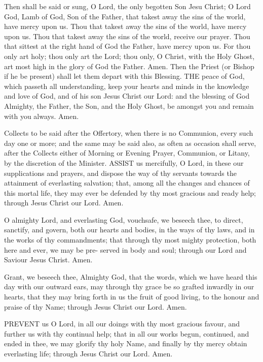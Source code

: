 Then shall be said or sung,
    O Lord, the only begotten Son Jesu Christ; O Lord God, Lamb of God, Son of the Father, that takest away the sins of the world, have mercy upon us. Thou that takest away the sins of the world, have mercy upon us. Thou that takest away the sins of the world, receive our prayer. Thou that sittest at the right hand of God the Father, have mercy upon us.
    For thou only art holy; thou only art the Lord; thou only, O Christ, with the Holy Ghost, art most high in the glory of God the Father. Amen.
Then the Priest (or Bishop if he be present) shall let them depart with this Blessing.
THE peace of God, which passeth all understanding, keep your hearts and minds in the knowledge and love of God, and of his son Jesus Christ our Lord: and the blessing of God Almighty, the Father, the Son, and the Holy Ghost, be amongst you and remain with you always. Amen.

Collects to be said after the Offertory, when there is no Communion, every such day one or more; and the same may be said also, as often as occasion shall serve, after the Collects either of Morning or Evening Prayer, Communion, or Litany, by the discretion of the Minister.
ASSIST us mercifully, O Lord, in these our supplications and prayers, and dispose the way of thy servants towards the attainment of everlasting salvation; that, among all the changes and chances of this mortal life, they may ever be defended by thy most gracious and ready help; through Jesus Christ our Lord. Amen.

O almighty Lord, and everlasting God, vouchsafe, we beseech thee, to direct, sanctify, and govern, both our hearts and bodies, in the ways of thy laws, and in the works of thy commandments; that through thy most mighty protection, both here and ever, we may be pre- served in body and soul; through our Lord and Saviour Jesus Christ. Amen.

Grant, we beseech thee, Almighty God, that the words, which we have heard this day with our outward ears, may through thy grace be so grafted inwardly in our hearts, that they may bring forth in us the fruit of good living, to the honour and praise of thy Name; through Jesus Christ our Lord. Amen.

PREVENT us O Lord, in all our doings with thy most gracious favour, and further us with thy continual help; that in all our works begun, continued, and ended in thee, we may glorify thy holy Name, and finally by thy mercy obtain everlasting life; through Jesus Christ our Lord. Amen.

